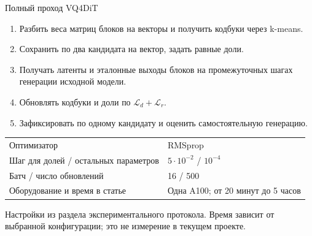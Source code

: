\documentclass[aspectratio=169,10pt]{beamer}
\newcommand{\smalltext}[1]{{\fontsize{10}{12}\selectfont #1\par}}
\newcommand{\tights}{\setlength{\itemsep}{1.4mm}\setlength{\parsep}{0pt}\setlength{\parskip}{0pt}}
\newenvironment{datatable}{\par\begingroup\fontsize{10}{12}\selectfont\setlength{\tabcolsep}{4pt}\renewcommand{\arraystretch}{1.25}}{\par\endgroup}
\begin{document}
\begin{frame}[t]{Полный проход VQ4DiT}
  \begin{enumerate}\tights
    \item Разбить веса матриц блоков на векторы и получить кодбуки через k-means.
    \item Сохранить по два кандидата на вектор, задать равные доли.
    \item Получать латенты и эталонные выходы блоков на промежуточных шагах
    генерации исходной модели.
    \item Обновлять кодбуки и доли по $\mathcal L_d+\mathcal L_r$.
    \item Зафиксировать по одному кандидату и оценить самостоятельную генерацию.
  \end{enumerate}
  \begin{datatable}
    \begin{tabular*}{\textwidth}{@{\extracolsep{\fill}}ll@{}}
      \toprule
      Оптимизатор & RMSprop \\
      Шаг для долей / остальных параметров & $5\cdot10^{-2}$ / $10^{-4}$ \\
      Батч / число обновлений & 16 / 500 \\
      Оборудование и время в статье & Одна A100; от 20 минут до 5 часов \\
      \bottomrule
    \end{tabular*}
  \end{datatable}
  \smalltext{Настройки из раздела экспериментального протокола. Время зависит от выбранной конфигурации;
  это не измерение в текущем проекте.}
\end{frame}
\end{document}
